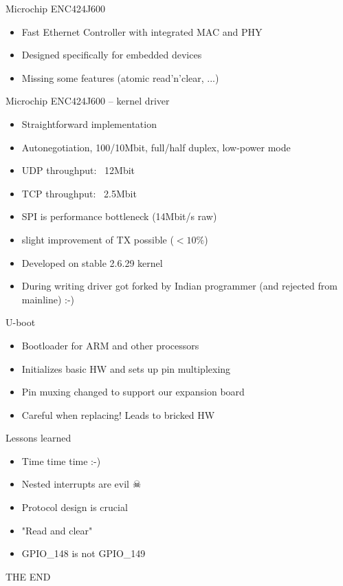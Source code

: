 \documentclass{beamer}
\begin{document}
\begin{frame}{Microchip ENC424J600}
\begin{itemize}
	\item Fast Ethernet Controller with integrated MAC and PHY
	\item Designed specifically for embedded devices
\end{itemize}

\begin{itemize}
	\item Missing some features (atomic read'n'clear, ...)
\end{itemize}

\end{frame}

\begin{frame}{Microchip ENC424J600 -- kernel driver}
\begin{itemize}
	\item Straightforward implementation
	\item Autonegotiation, 100/10Mbit, full/half duplex, low-power mode
	\item UDP throughput: ~12Mbit
	\item TCP throughput: ~2.5Mbit
	\item SPI is performance bottleneck (14Mbit/s raw)
	\item slight improvement of TX possible (\( < 10\%\))
\end{itemize}

\begin{itemize}
	\item Developed on stable 2.6.29 kernel
	\item During writing driver got forked by Indian programmer (and rejected from mainline) :-)
\end{itemize}
\end{frame}

\begin{frame}{U-boot}
\begin{itemize}
	\item Bootloader for ARM and other processors
	\item Initializes basic HW and sets up pin multiplexing
	\item Pin muxing changed to support our expansion board
	\item Careful when replacing! Leads to bricked HW
\end{itemize}
\end{frame}

\begin{frame}{Lessons learned}
\begin{itemize}
	\item Time time time :-)
	\item Nested interrupts are evil \(\skull\)
	\item Protocol design is crucial
	\item "Read and clear"
	\item GPIO\_148 is not GPIO\_149
\end{itemize}
\end{frame}

\begin{frame}{THE END}
\end{frame}
\end{document}
